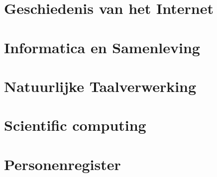 \documentclass[11pt]{article}
\theoremstyle{definition}
\begin{document}
\section{Geschiedenis van het Internet}


\section{Informatica en Samenleving}


\section{Natuurlijke Taalverwerking}


\section{Scientific computing}



\appendix
\section{Personenregister}



\printindex

%
%
\nocite{*}
\end{document}
